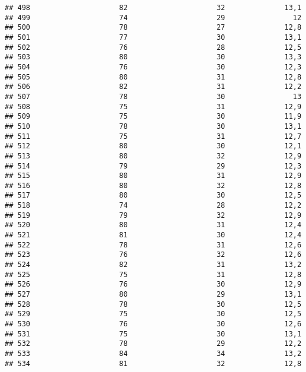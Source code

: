 \documentclass[
]{article}
\begin{document}
\begin{verbatim}
## 498                     82                     32              13,1
## 499                     74                     29                12
## 500                     78                     27              12,8
## 501                     77                     30              13,1
## 502                     76                     28              12,5
## 503                     80                     30              13,3
## 504                     76                     30              12,3
## 505                     80                     31              12,8
## 506                     82                     31              12,2
## 507                     78                     30                13
## 508                     75                     31              12,9
## 509                     75                     30              11,9
## 510                     78                     30              13,1
## 511                     75                     31              12,7
## 512                     80                     30              12,1
## 513                     80                     32              12,9
## 514                     79                     29              12,3
## 515                     80                     31              12,9
## 516                     80                     32              12,8
## 517                     80                     30              12,5
## 518                     74                     28              12,2
## 519                     79                     32              12,9
## 520                     80                     31              12,4
## 521                     81                     30              12,4
## 522                     78                     31              12,6
## 523                     76                     32              12,6
## 524                     82                     31              13,2
## 525                     75                     31              12,8
## 526                     76                     30              12,9
## 527                     80                     29              13,1
## 528                     78                     30              12,5
## 529                     75                     30              12,5
## 530                     76                     30              12,6
## 531                     75                     30              13,1
## 532                     78                     29              12,2
## 533                     84                     34              13,2
## 534                     81                     32              12,8

\end{verbatim}
\end{document}
